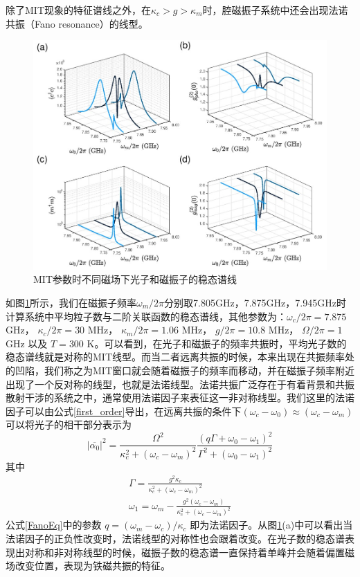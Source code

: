 除了MIT现象的特征谱线之外，在$\kappa_c>g>\kappa_m$时，腔磁振子系统中还会出现法诺共振（Fano resonance）的线型。
\begin{figure}[htbp]
	\centering
	\includegraphics[width=2\basefigurewidth,clip]{./figure/4_6}
	\caption{MIT参数时不同磁场下光子和磁振子的稳态谱线} 
	\label{MITOmVary}
\end{figure}
如图\ref{MITOmVary}所示，我们在磁振子频率$\omega_m/2\pi$分别取7.805GHz，7.875GHz，7.945GHz时计算系统中平均粒子数与二阶关联函数的稳态谱线，其他参数为：$\omega_c/2\pi=7.875$ GHz， $\kappa_c/2\pi=30$ MHz， $\kappa_m/2\pi=1.06$ MHz， $g/2\pi=10.8$ MHz， $\Omega/2\pi=1$ GHz 以及 $T=300$ K。可以看到，在光子和磁振子的频率共振时，平均光子数的稳态谱线就是对称的MIT线型。而当二者远离共振的时候，本来出现在共振频率处的凹陷，我们称之为MIT窗口就会随着磁振子的频率而移动，并在磁振子频率附近出现了一个反对称的线型，也就是法诺线型。法诺共振广泛存在于有着背景和共振散射干涉的系统之中，通常使用法诺因子来表征这一非对称线型。我们这里的法诺因子可以由公式\eqref{first_order}导出，在远离共振的条件下$(\omega_c-\omega_0)\approx(\omega_c-\omega_m)$可以将光子的相干部分表示为
\begin{equation}
|\overline{\alpha_{0}}|^{2} =\frac{\Omega^{2}}{\kappa_{c}^{2}+(\omega_{c}-\omega_{m})^{2}}\frac{(q\Gamma+\omega_{0}-\omega_{1})^{2}}{\Gamma^{2}+(\omega_{0}-\omega_{1})^{2}}
\label{FanoEq}
\end{equation}
其中
\begin{gather}
\Gamma=\frac{g^{2}\kappa_{c}}{\kappa_{c}^{2}+(\omega_{c}-\omega_{m})^{2}} \\
\omega_{1}=\omega_{m}-\frac{g^{2}(\omega_{c}-\omega_{m})}{\kappa_{c}^{2}+(\omega_{c}-\omega_{m})^{2}}
\end{gather}
公式\eqref{FanoEq}中的参数 $q=(\omega_{m}-\omega_{c})/\kappa_c$ 即为法诺因子。从图\ref{MITOmVary}(a)中可以看出当法诺因子的正负性改变时，法诺线型的对称性也会跟着改变。在光子数的稳态谱表现出对称和非对称线型的时候，磁振子数的稳态谱一直保持着单峰并会随着偏置磁场改变位置，表现为铁磁共振的特征。


